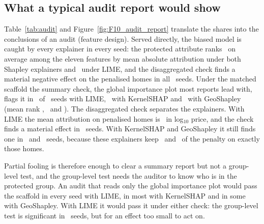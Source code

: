 \subsection{What a typical audit report would show}\label{sec:audit-report}
Table~\ref{tab:audit} and Figure~\ref{fig:F10_audit_report} translate the shares into the conclusions of an audit
(feature design). Served directly, the biased model is caught by every explainer in every seed: the protected attribute
ranks \AuditKernelSHAPBiasedRank\ on average among the eleven features by mean absolute attribution under both Shapley
explainers and \AuditLIMEBiasedRank\ under LIME, and the disaggregated check finds a material negative effect on the
penalised homes in all \AuditKernelSHAPBiasedSeeds\ seeds. Under the matched scaffold the summary check, the global
importance plot most reports lead with, flags it in \AuditLIMEMatSummaryN\ of \AuditLIMEMatSeeds\ seeds with LIME,
\AuditKernelSHAPMatSummaryN\ with KernelSHAP and \AuditGeoShapleyMatSummaryN\ with GeoShapley (mean rank
\AuditLIMEMatRank, \AuditKernelSHAPMatRank\ and \AuditGeoShapleyMatRank). The disaggregated check separates the
explainers. With LIME the mean attribution on penalised homes is \AuditLIMEMatMeanPen\ in log$_{10}$ price, and the
check finds a material effect in \AuditLIMEMatMaterialN\ seeds. With KernelSHAP and GeoShapley it still finds one in
\AuditKernelSHAPMatMaterialN\ and \AuditGeoShapleyMatMaterialN\ seeds, because these explainers keep
\FKernelSHAPMatKept\ and \FGeoShapleyMatKept\ of the penalty on exactly those homes.

Partial fooling is therefore enough to clear a summary report but not a group-level test, and the group-level test
needs the auditor to know who is in the protected group. An audit that reads only the global importance plot would pass
the scaffold in every seed with LIME, in most with KernelSHAP and in some with GeoShapley. With LIME it would pass it
under either check: the group-level test is significant in \AuditLIMEMatDisaggN\ seeds, but for an effect too small to
act on.


